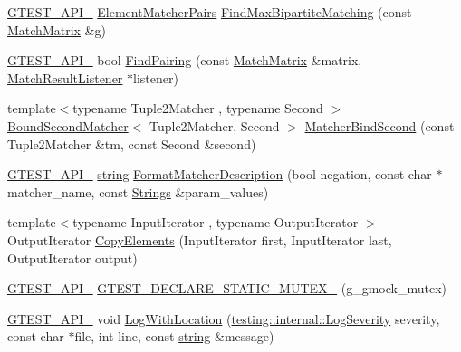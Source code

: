 \begin{DoxyCompactItemize}
\item 
\hyperlink{gtest-port_8h_aa73be6f0ba4a7456180a94904ce17790}{G\+T\+E\+S\+T\+\_\+\+A\+P\+I\+\_\+} \hyperlink{namespacetesting_1_1internal_a0038618710c01a71150887dc7cfb0a29}{Element\+Matcher\+Pairs} \hyperlink{namespacetesting_1_1internal_ae30bd8357c179334b2b09b0d689efccc}{Find\+Max\+Bipartite\+Matching} (const \hyperlink{classtesting_1_1internal_1_1_match_matrix}{Match\+Matrix} \&g)
\item 
\hyperlink{gtest-port_8h_aa73be6f0ba4a7456180a94904ce17790}{G\+T\+E\+S\+T\+\_\+\+A\+P\+I\+\_\+} bool \hyperlink{namespacetesting_1_1internal_af2bd2e350b56422a3d9d3b986ac1df0e}{Find\+Pairing} (const \hyperlink{classtesting_1_1internal_1_1_match_matrix}{Match\+Matrix} \&matrix, \hyperlink{classtesting_1_1_match_result_listener}{Match\+Result\+Listener} $\ast$listener)
\item 
{\footnotesize template$<$typename Tuple2\+Matcher , typename Second $>$ }\\\hyperlink{classtesting_1_1internal_1_1_bound_second_matcher}{Bound\+Second\+Matcher}$<$ Tuple2\+Matcher, Second $>$ \hyperlink{namespacetesting_1_1internal_a31eb77a2bb0ca713d6ef07d8a3b9af9e}{Matcher\+Bind\+Second} (const Tuple2\+Matcher \&tm, const Second \&second)
\item 
\hyperlink{gtest-port_8h_aa73be6f0ba4a7456180a94904ce17790}{G\+T\+E\+S\+T\+\_\+\+A\+P\+I\+\_\+} \hyperlink{namespacetesting_1_1internal_a8e8ff5b11e64078831112677156cb111}{string} \hyperlink{namespacetesting_1_1internal_a593b52fcbb46a765a31850661b1960f4}{Format\+Matcher\+Description} (bool negation, const char $\ast$matcher\+\_\+name, const \hyperlink{namespacetesting_1_1internal_a7706b17f05f4b49e351b052ae4e05073}{Strings} \&param\+\_\+values)
\item 
{\footnotesize template$<$typename Input\+Iterator , typename Output\+Iterator $>$ }\\Output\+Iterator \hyperlink{namespacetesting_1_1internal_a9372c12747bcf964aacb1284f8048cae}{Copy\+Elements} (Input\+Iterator first, Input\+Iterator last, Output\+Iterator output)
\item 
\hyperlink{gtest-port_8h_aa73be6f0ba4a7456180a94904ce17790}{G\+T\+E\+S\+T\+\_\+\+A\+P\+I\+\_\+} \hyperlink{namespacetesting_1_1internal_ae4d273e9b76b40a28483826518e68f17}{G\+T\+E\+S\+T\+\_\+\+D\+E\+C\+L\+A\+R\+E\+\_\+\+S\+T\+A\+T\+I\+C\+\_\+\+M\+U\+T\+E\+X\+\_\+} (g\+\_\+gmock\+\_\+mutex)
\item 
\hyperlink{gtest-port_8h_aa73be6f0ba4a7456180a94904ce17790}{G\+T\+E\+S\+T\+\_\+\+A\+P\+I\+\_\+} void \hyperlink{namespacetesting_1_1internal_af271cd1fc0b62a7f4736cb3109e86a37}{Log\+With\+Location} (\hyperlink{namespacetesting_1_1internal_a203d1a8a2147a53d12bbdae40d443914}{testing\+::internal\+::\+Log\+Severity} severity, const char $\ast$file, int line, const \hyperlink{namespacetesting_1_1internal_a8e8ff5b11e64078831112677156cb111}{string} \&message)

\end{DoxyCompactItemize}
